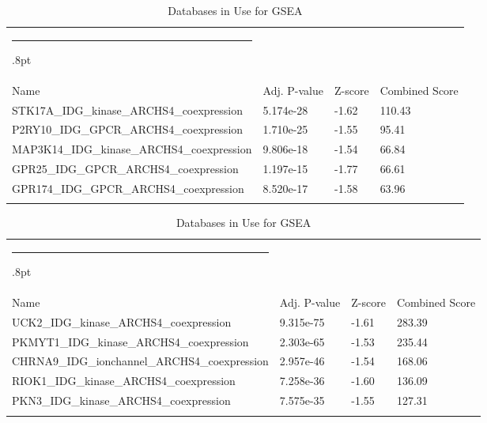 \documentclass[3p,authoryear,preprint,12pt]{elsarticle}
\makeatletter
\def\hlinewd#1{%
  \noalign{\ifnum0=`}\fi\hrule \@height #1%
  \futurelet\reserved@a\@xhline}
\def\tbltoprule{\hlinewd{.8pt}\\[-12pt]}
\def\tblbottomrule{\noalign{\vspace*{6pt}}\hline\noalign{\vspace*{2pt}}}
\def\tblmidrule{\noalign{\vspace*{6pt}}\hline\noalign{\vspace*{2pt}}}
\makeatother
\begin{document}
\begin{table*}[!htbp]
	\caption{{Databases in Use for GSEA} }
	\label{tw-de478ae31cc6}
	\def\arraystretch{1}
	\ignorespaces 
	\centering 
	\begin{tabulary}{\linewidth}{p{\dimexpr.65\tabcolsep}p{\dimexpr.15\tabcolsep}p{\dimexpr.1\tabcolsep}p{\dimexpr.1\tabcolsep}}
		\tbltoprule Name & Adj. P-value & Z-score & Combined Score\\
		\tblmidrule
STK17A\_IDG\_kinase\_ARCHS4\_coexpression & 5.174e-28 & -1.62 & 110.43 \\
P2RY10\_IDG\_GPCR\_ARCHS4\_coexpression & 1.710e-25 & -1.55 & 95.41 \\
MAP3K14\_IDG\_kinase\_ARCHS4\_coexpression & 9.806e-18 & -1.54 & 66.84 \\
GPR25\_IDG\_GPCR\_ARCHS4\_coexpression & 1.197e-15 & -1.77 & 66.61 \\
GPR174\_IDG\_GPCR\_ARCHS4\_coexpression & 8.520e-17 & -1.58 & 63.96 \\
		\tblbottomrule
	\end{tabulary}\par 
\end{table*}
\begin{table*}[!htbp]
	\caption{{Databases in Use for GSEA} }
	\label{tw-de478ae31cc6}
	\def\arraystretch{1}
	\ignorespaces 
	\centering 
	\begin{tabulary}{\linewidth}{p{\dimexpr.65\tabcolsep}p{\dimexpr.15\tabcolsep}p{\dimexpr.1\tabcolsep}p{\dimexpr.1\tabcolsep}}
		\tbltoprule Name & Adj. P-value & Z-score & Combined Score\\
		\tblmidrule
UCK2\_IDG\_kinase\_ARCHS4\_coexpression & 9.315e-75 & -1.61 & 283.39 \\
PKMYT1\_IDG\_kinase\_ARCHS4\_coexpression & 2.303e-65 & -1.53 & 235.44 \\
CHRNA9\_IDG\_ionchannel\_ARCHS4\_coexpression & 2.957e-46 & -1.54 & 168.06 \\
RIOK1\_IDG\_kinase\_ARCHS4\_coexpression & 7.258e-36 & -1.60 & 136.09 \\
PKN3\_IDG\_kinase\_ARCHS4\_coexpression & 7.575e-35 & -1.55 & 127.31 \\
		\tblbottomrule
	\end{tabulary}\par 
\end{table*}
\end{document}
